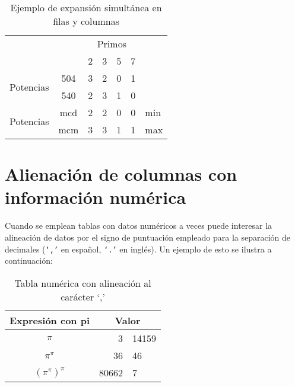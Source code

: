 \documentclass[11pt,a4paper]{article}
\begin{document}
\begin{table}[H]%
	\centering
	\caption{Ejemplo de expansión simultánea en filas y columnas}
	\label{tab:expsimul}
	\begin{tabular}{cc|c|c|c|c|l} %
	\cline{3-6}
	& & \multicolumn{4}{|c|}{Primos} \\ \cline{3-6}
	& & 2 & 3 & 5 & 7 \\ \cline{1-6}
	\multicolumn{1}{|c|}{\multirow{2}{*}{Potencias}} &
	\multicolumn{1}{|c|}{504} & 3 & 2 & 0 & 1 &     \\ \cline{2-6}
	\multicolumn{1}{|c|}{}                        &
	\multicolumn{1}{|c|}{540} & 2 & 3 & 1 & 0 &     \\ \cline{1-6}
	\multicolumn{1}{|c|}{\multirow{2}{*}{Potencias}} &
	\multicolumn{1}{|c|}{mcd} & 2 & 2 & 0 & 0 & min \\ \cline{2-6}
	\multicolumn{1}{|c|}{}                        &
	\multicolumn{1}{|c|}{mcm} & 3 & 3 & 1 & 1 & max \\ \cline{1-6}
	\end{tabular}
\end{table}








\section{Alienación de columnas con información numérica}
Cuando se emplean tablas con datos numéricos a veces puede interesar la alineación de datos por el signo de puntuación empleado para la separación de decimales (\texttt{`,'} en español, \texttt{`.'} en inglés). Un ejemplo de esto se ilustra a continuación:

\begin{table}[H]%
	\centering
	\caption{Tabla numérica con alineación al carácter `,'}
	\label{tab:alineada}
	\begin{tabular}{c r@{,} l}
    \toprule
	Expresión con pi & \multicolumn{2}{c}{Valor} \\
	\midrule
	$\pi$                   &      3 & 14159 \\
	$\pi^{\pi}$             & 36     &    46 \\
	$(\pi^{\pi})^{\pi}$     &  80662 & 7     \\
    \bottomrule
	\end{tabular}
\end{table}
\end{document}
